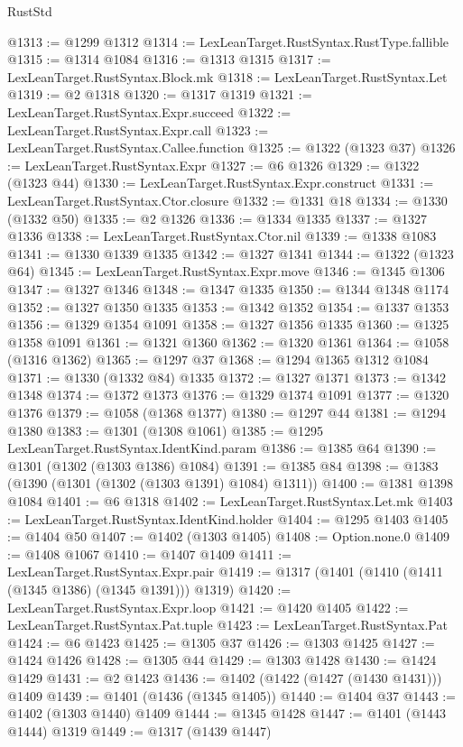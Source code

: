 \begin{lexlean}{RustStd}
\begin{coremodule}
@1313 := @1299 @1312
@1314 := LexLeanTarget.RustSyntax.RustType.fallible
@1315 := @1314 @1084
@1316 := @1313 @1315
@1317 := LexLeanTarget.RustSyntax.Block.mk
@1318 := LexLeanTarget.RustSyntax.Let
@1319 := @2 @1318
@1320 := @1317 @1319
@1321 := LexLeanTarget.RustSyntax.Expr.succeed
@1322 := LexLeanTarget.RustSyntax.Expr.call
@1323 := LexLeanTarget.RustSyntax.Callee.function
@1325 := @1322 (@1323 @37)
@1326 := LexLeanTarget.RustSyntax.Expr
@1327 := @6 @1326
@1329 := @1322 (@1323 @44)
@1330 := LexLeanTarget.RustSyntax.Expr.construct
@1331 := LexLeanTarget.RustSyntax.Ctor.closure
@1332 := @1331 @18
@1334 := @1330 (@1332 @50)
@1335 := @2 @1326
@1336 := @1334 @1335
@1337 := @1327 @1336
@1338 := LexLeanTarget.RustSyntax.Ctor.nil
@1339 := @1338 @1083
@1341 := @1330 @1339 @1335
@1342 := @1327 @1341
@1344 := @1322 (@1323 @64)
@1345 := LexLeanTarget.RustSyntax.Expr.move
@1346 := @1345 @1306
@1347 := @1327 @1346
@1348 := @1347 @1335
@1350 := @1344 @1348 @1174
@1352 := @1327 @1350 @1335
@1353 := @1342 @1352
@1354 := @1337 @1353
@1356 := @1329 @1354 @1091
@1358 := @1327 @1356 @1335
@1360 := @1325 @1358 @1091
@1361 := @1321 @1360
@1362 := @1320 @1361
@1364 := @1058 (@1316 @1362)
@1365 := @1297 @37
@1368 := @1294 @1365 @1312 @1084
@1371 := @1330 (@1332 @84) @1335
@1372 := @1327 @1371
@1373 := @1342 @1348
@1374 := @1372 @1373
@1376 := @1329 @1374 @1091
@1377 := @1320 @1376
@1379 := @1058 (@1368 @1377)
@1380 := @1297 @44
@1381 := @1294 @1380
@1383 := @1301 (@1308 @1061)
@1385 := @1295 LexLeanTarget.RustSyntax.IdentKind.param
@1386 := @1385 @64
@1390 := @1301 (@1302 (@1303 @1386) @1084)
@1391 := @1385 @84
@1398 := @1383 (@1390 (@1301 (@1302 (@1303 @1391) @1084) @1311))
@1400 := @1381 @1398 @1084
@1401 := @6 @1318
@1402 := LexLeanTarget.RustSyntax.Let.mk
@1403 := LexLeanTarget.RustSyntax.IdentKind.holder
@1404 := @1295 @1403
@1405 := @1404 @50
@1407 := @1402 (@1303 @1405)
@1408 := Option.none.{0}
@1409 := @1408 @1067
@1410 := @1407 @1409
@1411 := LexLeanTarget.RustSyntax.Expr.pair
@1419 := @1317 (@1401 (@1410 (@1411 (@1345 @1386) (@1345 @1391))) @1319)
@1420 := LexLeanTarget.RustSyntax.Expr.loop
@1421 := @1420 @1405
@1422 := LexLeanTarget.RustSyntax.Pat.tuple
@1423 := LexLeanTarget.RustSyntax.Pat
@1424 := @6 @1423
@1425 := @1305 @37
@1426 := @1303 @1425
@1427 := @1424 @1426
@1428 := @1305 @44
@1429 := @1303 @1428
@1430 := @1424 @1429
@1431 := @2 @1423
@1436 := @1402 (@1422 (@1427 (@1430 @1431))) @1409
@1439 := @1401 (@1436 (@1345 @1405))
@1440 := @1404 @37
@1443 := @1402 (@1303 @1440) @1409
@1444 := @1345 @1428
@1447 := @1401 (@1443 @1444) @1319
@1449 := @1317 (@1439 @1447)

\end{coremodule}
\end{lexlean}
